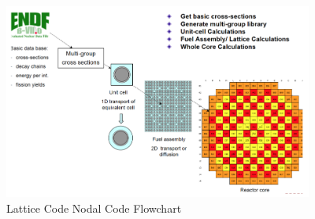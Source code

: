 \documentclass{school-22.211-notes}
\begin{document}
\begin{figure}[ht]
  \centering
  \includegraphics[width=4in]{images/design/lattice-nodal-code.png}
  \caption{Lattice Code Nodal Code Flowchart} \label{lattice-nodal-code}
\end{figure}
\end{document}
